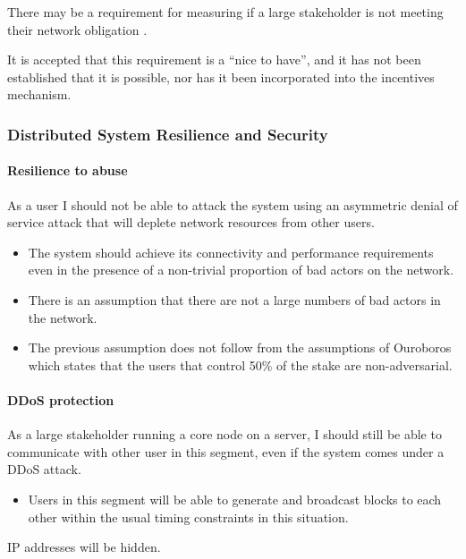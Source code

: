 \documentclass{report}
\theoremstyle{definition}{
  \newtheorem{lemma}{Lemma}[section] %
  \newtheorem{definition}[lemma]{Definition}
}
\theoremstyle{theorem}{
  \newtheorem{invariant}[lemma]{Invariant}
  \newtheorem{proofobligation}[lemma]{Proof Obligation}
}
\numberwithin{equation}{lemma}
\begin{document}
There may be a requirement for measuring if a large stakeholder is not meeting
their network obligation \cite{DBLP:journals/corr/abs-1807-11218}.

It is accepted that this requirement is a ``nice to have'', and it has not been
established that it is possible, nor has it been incorporated into the
incentives mechanism.

\subsubsection{Distributed System Resilience and Security}

\paragraph{Resilience to abuse}

As a user I should not be able to attack the system using an asymmetric denial
of service attack that will deplete network resources from other users.

\begin{itemize}
\item The system should achieve its connectivity and performance requirements
      even in the presence of a non-trivial proportion of bad actors on the
      network.
\item There is an assumption that there are not a large numbers of bad actors
      in the network.
\item The previous assumption does not follow from the assumptions of Ouroboros
      which states that the users that control 50\% of the stake are
      non-adversarial.
\end{itemize}


\paragraph{DDoS protection}

As a large stakeholder running a core node on a server, I should still be able
to communicate with other user in this segment, even if the system comes under
a DDoS attack.

\begin{itemize}
\item Users in this segment will be able to generate and broadcast blocks to
      each other within the usual timing constraints in this situation.
\end{itemize}

IP addresses will be hidden.
\end{document}
